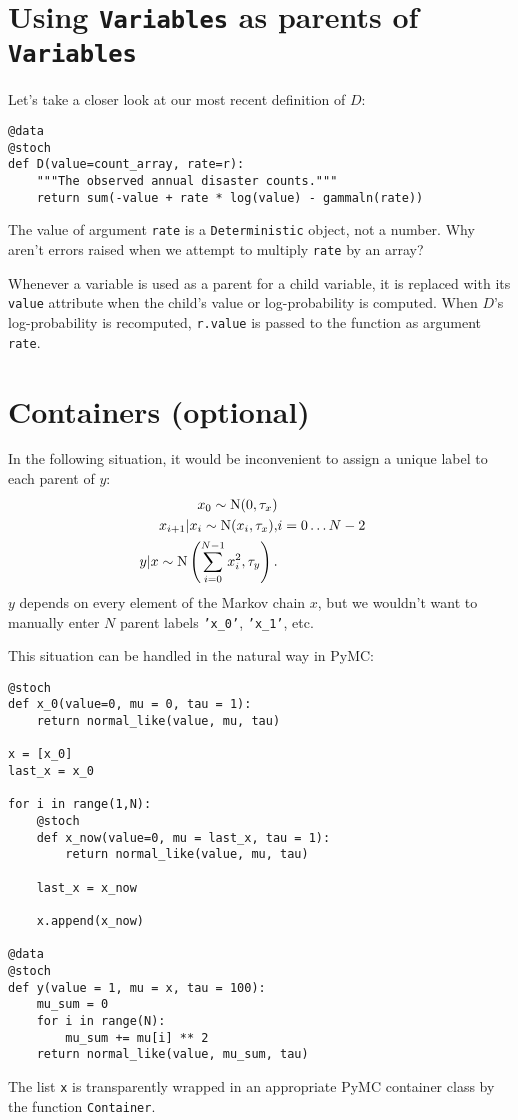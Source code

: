 \section{Using \texttt{Variables} as parents of \texttt{Variables}}

Let's take a closer look at our most recent definition of $D$:
\begin{verbatim}
@data
@stoch
def D(value=count_array, rate=r):
    """The observed annual disaster counts."""
    return sum(-value + rate * log(value) - gammaln(rate))
\end{verbatim}
The value of argument \texttt{rate} is a \texttt{Deterministic} object, not a number. Why aren't errors raised when we attempt to multiply \texttt{rate} by an array?

Whenever a variable is used as a parent for a child variable, it is replaced with its \texttt{value} attribute when the child's value or log-probability is computed. When $D$'s log-probability is recomputed, \texttt{r.value} is passed to the function as argument \texttt{rate}. 

\section{Containers (optional)}\label{sub:container}
In the following situation, it would be inconvenient to assign a unique label to each parent of $y$:
\begin{eqnarray*}
    x_0 \sim \textup N(0,\tau_x)\\
    x_{i+1}|x_i\sim\textup{N}(x_i, \tau_x),& i=0\ldots N-2\\
    y|x \sim \textup N\left(\sum_{i=0}^{N-1}x_i^2,\tau_y\right).
\end{eqnarray*}
$y$ depends on every element of the Markov chain $x$, but we wouldn't want to manually enter $N$ parent labels \texttt{'x_0'}, \texttt{'x_1'}, etc.

This situation can be handled in the natural way in PyMC:
\begin{verbatim}
@stoch
def x_0(value=0, mu = 0, tau = 1):
    return normal_like(value, mu, tau)

x = [x_0]
last_x = x_0

for i in range(1,N):          
    @stoch
    def x_now(value=0, mu = last_x, tau = 1):
        return normal_like(value, mu, tau)
        
    last_x = x_now
    
    x.append(x_now)

@data
@stoch
def y(value = 1, mu = x, tau = 100):
    mu_sum = 0
    for i in range(N):
        mu_sum += mu[i] ** 2
    return normal_like(value, mu_sum, tau)
\end{verbatim}
The list \texttt{x} is transparently wrapped in an appropriate PyMC container class by the function \texttt{Container}.

